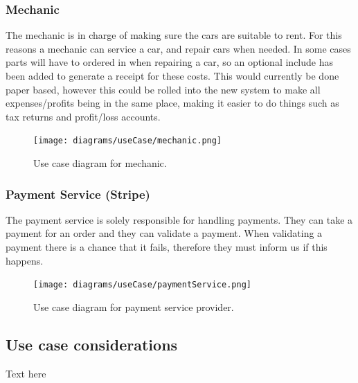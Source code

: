     \subsubsection{Mechanic}
      The mechanic is in charge of making sure the cars are suitable to rent. For this reasons a mechanic can service a car, and repair cars
      when needed. In some cases parts will have to ordered in when repairing a car, so an optional include has been added to generate a receipt
      for these costs. This would currently be done paper based, however this could be rolled into the new system to make all expenses/profits 
      being in the same place, making it easier to do things such as tax returns and profit/loss accounts.
      \begin{figure}[H]
        \centering
        \texttt{[image: diagrams/useCase/mechanic.png]}
        \caption{Use case diagram for mechanic.}
        \label{fig:UCmechanic}
      \end{figure}

    \subsubsection{Payment Service (Stripe)}
      The payment service is solely responsible for handling payments. They can take a payment for an order and they can
      validate a payment. When validating a payment there is a chance that it fails, therefore they must inform us if this
      happens.
      \begin{figure}[H]
        \centering
        \texttt{[image: diagrams/useCase/paymentService.png]}
        \caption{Use case diagram for payment service provider.}
        \label{fig:UCpayment}
      \end{figure}
  
  \subsection{Use case considerations}
      Text here
\newpage